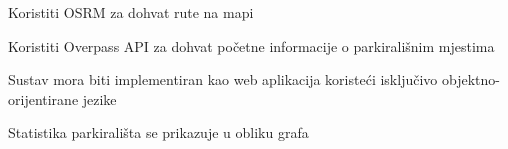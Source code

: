 			 \begin{packed_enum}

				\item Koristiti OSRM za dohvat rute na mapi
				\item Koristiti Overpass API za dohvat početne informacije o parkirališnim mjestima
				\item Sustav mora biti implementiran kao web aplikacija koristeći isključivo objektno-orijentirane jezike
				\item Statistika parkirališta se prikazuje u obliku grafa
				
			 \end{packed_enum}
			 
			 

